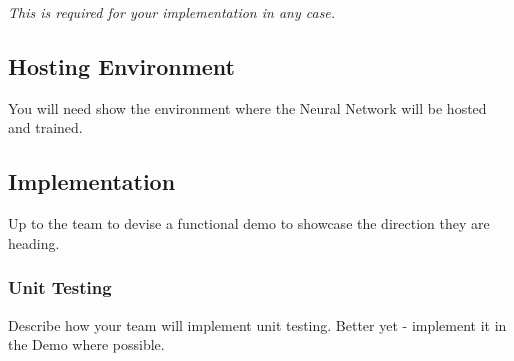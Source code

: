 \documentclass{article}
\begin{document}
\begin{center}
   \textit{This is required for your implementation in any case.}
\end{center}

\subsection{Hosting Environment}
You will need show the environment where the Neural Network will be hosted and trained.

\subsection{Implementation}
Up to the team to devise a functional demo to showcase the direction they are heading.

\subsubsection{Unit Testing}
Describe how your team will implement unit testing. Better yet - implement it in the Demo where possible.
\end{document}
